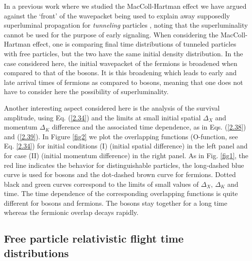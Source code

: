 \documentclass[preprint,aps]{revtex4}
\begin{document}
In a previous work where we studied the MacColl-Hartman effect we have argued against the `front' of the wavepacket being used to explain away supposedly superluminal propagation for \textit{tunneling} particles \cite{dumont2020,rivlin2020}, noting that the superluminality cannot be used for the purpose of early signaling. When considering the MacColl-Hartman effect, one is comparing final time distributions of tunneled particles with free particles, but the two have the same initial density distribution. In the case considered here, the initial wavepacket of the fermions is broadened when compared to that of the bosons. It is this broadening which leads to early and late arrival times of fermions as compared to bosons, meaning that one does not have to consider here the possibility of superluminality.

Another interesting aspect considered here is 
the analysis of the survival amplitude, using Eq. (\ref{2.34}) 
and the limits at small initial spatial $\Delta_X$ and momentum $\Delta_K$ difference and the associated time dependence, as in Eqs. (\ref{2.38}) and (\ref{2.39}). In Figure \ref{fig2} we plot the overlapping functions (O-function, see Eq. \ref{2.34}) for  initial conditions (I) (initial spatial difference) in the left panel and for case (II) (initial momentum difference) in the right panel. 
As in Fig. \ref{fig1}, the red line indicates the behavior for distinguishable particles, the long-dashed blue curve is used for bosons and the dot-dashed brown curve for 
fermions. Dotted black and green curves correspond to the limits of small values of  $\Delta_X$, $\Delta_K$ and time. The time dependence of the corresponding overlapping functions is quite different for bosons and fermions. The bosons stay together for a long time whereas the fermionic overlap decays rapidly.



\subsection{Free particle relativistic flight time distributions}
\end{document}
